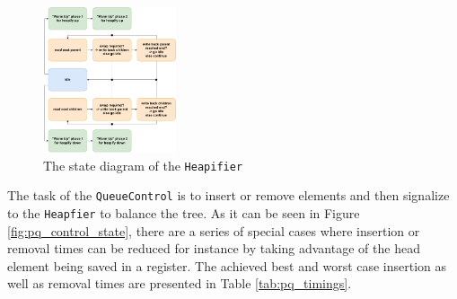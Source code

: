 \documentclass[conference]{IEEEtran}
\begin{document}
\begin{figure}
	\centering
	\includegraphics[width=0.35\textwidth]{HeapifierStateDiagram.pdf}
	\caption{The state diagram of the \texttt{Heapifier}}
	\label{fig:pq_heapifier_state}
\end{figure}

The task of the \texttt{QueueControl} is to insert or remove elements and then signalize to the \texttt{Heapfier} to balance the tree. As it can be seen in Figure 
\ref{fig:pq_control_state}, there are a series of special cases where insertion or removal times can be reduced for instance by taking advantage of the head element
being saved in a register. The achieved best and worst case insertion as well as removal times are presented in Table \ref{tab:pq_timings}.
\end{document}
